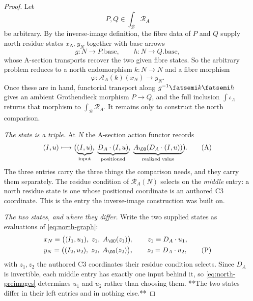 %

\begin{proof}
Let
\[
  P,Q\in\int_{\mathcal B}\mathcal R_A
\]
be arbitrary. By the inverse-image definition, the fibre data of $P$ and $Q$
supply north residue states $x_N,y_N$ together with base arrows
\[
  g:N\longrightarrow P.\mathrm{base},\qquad
  h:N\longrightarrow Q.\mathrm{base},
\]
whose A-section transports recover the two given fibre states. So the arbitrary
problem reduces to a north endomorphism $k:N\to N$ and a fibre morphism
\[
  \varphi:\mathcal A_A(k)(x_N)\longrightarrow y_N .
\]
Once these are in hand, functorial transport along
$g^{-1}\fatsemi k\fatsemi h$ gives an ambient Grothendieck morphism $P\to Q$,
and the full inclusion $\int\iota_A$ returns that morphism to
$\int_{\mathcal B}\mathcal R_A$. It remains only to construct the north
comparison.

\medskip
\noindent\emph{The state is a triple.}
At $N$ the A-section action functor records
\[
  (I,u)\longmapsto
  \bigl(\underbrace{(I,u)}_{\text{input}},\;
        \underbrace{D_A\mathbin{\cdot}(I,u)}_{\text{positioned}},\;
        \underbrace{A_{\OO}(D_A\mathbin{\cdot}(I,u))}_{\text{realized value}}\bigr).
                                    \tag{A}\label{eq:north-graph}
\]
The three entries carry the three things the comparison needs, and they carry
them separately. The residue condition of $\mathcal R_A(N)$ selects on the
\emph{middle} entry: a north residue state is one whose positioned coordinate is
an authored C3 coordinate. This is the entry the inverse-image construction was
built on.

\medskip
\noindent\emph{The two states, and where they differ.}
Write the two supplied states as evaluations of \eqref{eq:north-graph}:
\[
\begin{array}{l}
  x_N=\bigl((I_1,u_1),\;z_1,\;A_{\OO}(z_1)\bigr),\qquad
  z_1=D_A\mathbin{\cdot}u_1,\\[0.9ex]
  y_N=\bigl((I_2,u_2),\;z_2,\;A_{\OO}(z_2)\bigr),\qquad
  z_2=D_A\mathbin{\cdot}u_2,
                                    \tag{P}\label{eq:north-preimages}
\end{array}
\]
with $z_1,z_2$ the authored C3 coordinates their residue condition selects.
Since $D_A$ is invertible, each middle entry has exactly one input behind it, so
\eqref{eq:north-preimages} determines $u_1$ and $u_2$ rather than choosing them.
**The two states differ in their left entries and in nothing else.**


\end{proof}
